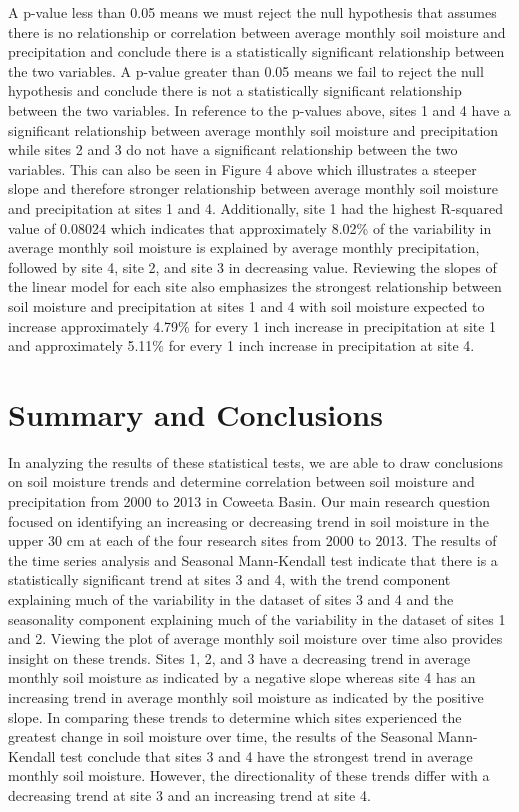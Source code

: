 \documentclass[
  12pt,
]{article}
\begin{document}
A p-value less than 0.05 means we must reject the null hypothesis that
assumes there is no relationship or correlation between average monthly
soil moisture and precipitation and conclude there is a statistically
significant relationship between the two variables. A p-value greater
than 0.05 means we fail to reject the null hypothesis and conclude there
is not a statistically significant relationship between the two
variables. In reference to the p-values above, sites 1 and 4 have a
significant relationship between average monthly soil moisture and
precipitation while sites 2 and 3 do not have a significant relationship
between the two variables. This can also be seen in Figure 4 above which
illustrates a steeper slope and therefore stronger relationship between
average monthly soil moisture and precipitation at sites 1 and 4.
Additionally, site 1 had the highest R-squared value of 0.08024 which
indicates that approximately 8.02\% of the variability in average
monthly soil moisture is explained by average monthly precipitation,
followed by site 4, site 2, and site 3 in decreasing value. Reviewing
the slopes of the linear model for each site also emphasizes the
strongest relationship between soil moisture and precipitation at sites
1 and 4 with soil moisture expected to increase approximately 4.79\% for
every 1 inch increase in precipitation at site 1 and approximately
5.11\% for every 1 inch increase in precipitation at site 4.

\newpage

\hypertarget{summary-and-conclusions}{%
\section{Summary and Conclusions}\label{summary-and-conclusions}}

In analyzing the results of these statistical tests, we are able to draw
conclusions on soil moisture trends and determine correlation between
soil moisture and precipitation from 2000 to 2013 in Coweeta Basin. Our
main research question focused on identifying an increasing or
decreasing trend in soil moisture in the upper 30 cm at each of the four
research sites from 2000 to 2013. The results of the time series
analysis and Seasonal Mann-Kendall test indicate that there is a
statistically significant trend at sites 3 and 4, with the trend
component explaining much of the variability in the dataset of sites 3
and 4 and the seasonality component explaining much of the variability
in the dataset of sites 1 and 2. Viewing the plot of average monthly
soil moisture over time also provides insight on these trends. Sites 1,
2, and 3 have a decreasing trend in average monthly soil moisture as
indicated by a negative slope whereas site 4 has an increasing trend in
average monthly soil moisture as indicated by the positive slope. In
comparing these trends to determine which sites experienced the greatest
change in soil moisture over time, the results of the Seasonal
Mann-Kendall test conclude that sites 3 and 4 have the strongest trend
in average monthly soil moisture. However, the directionality of these
trends differ with a decreasing trend at site 3 and an increasing trend
at site 4.
\end{document}
